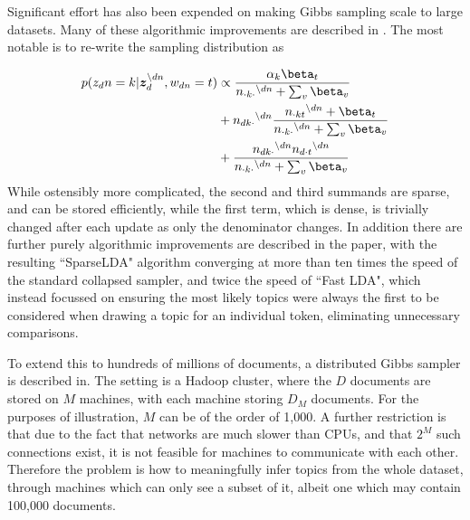 Significant effort has also been expended on making Gibbs sampling scale to large datasets. Many of these algorithmic improvements are described in \cite{Yao2009}. The most notable is to re-write the sampling distribution as

\newcommand \nodn { { ^{\setminus dn } } }

\begin{align}
\begin{split}
p(z_dn = k | \vv{z}_{d}^{\setminus dn}, w_{dn}=t) & \propto \frac{\alpha_k \beta_t}{n_{\cdot k \cdot}\nodn + \sum_v \beta_v} \\
& + n_{dk\cdot}\nodn \frac{n_{\cdot kt}\nodn + \beta_t}{n_{\cdot k \cdot}\nodn + \sum_v \beta_v} \\
& + \frac{n_{dk\cdot}\nodn n_{d\cdot t}\nodn}{n_{\cdot k \cdot}\nodn + \sum_v \beta_v}
\end{split}
\end{align}
While ostensibly more complicated, the second and third summands are sparse, and can be stored efficiently, while the first term, which is dense, is trivially changed after each update as only the denominator changes. In addition there are further purely algorithmic improvements are described in the paper, with the resulting ``SparseLDA" algorithm converging at more than ten times the speed of the standard collapsed sampler, and twice the speed of ``Fast LDA"\cite{Porteous2008}, which instead focussed on ensuring the most likely topics were always the first to be considered when drawing a topic for an individual token, eliminating unnecessary comparisons.


To extend this to hundreds of millions of documents, a distributed Gibbs sampler is described in\cite{Newman2009}. The setting is a Hadoop cluster, where the $D$ documents are stored on $M$ machines, with each machine storing $D_M$ documents. For the purposes of illustration, $M$ can be of the order of 1,000. A further restriction is that due to the fact that networks are much slower than CPUs, and that $2^M$ such connections exist, it is not feasible for machines to communicate with each other. Therefore the problem is how to meaningfully infer topics from the whole dataset, through machines which can only see a subset of it, albeit one which may contain 100,000 documents.


